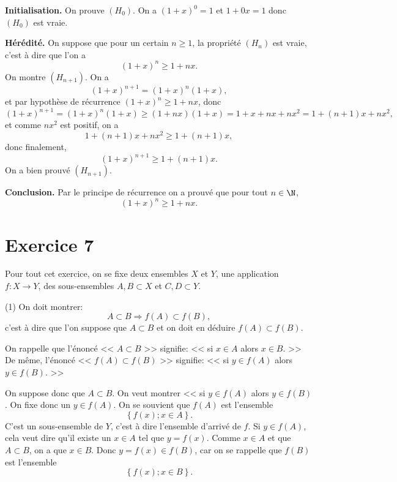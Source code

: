 \documentclass[12pt, a4paper,oneside]{article} %
\begin{document}
\textbf{Initialisation.}
On prouve $ (H_{0}) $.
On a $ (1+x)^{0} = 1 $
et $ 1 + 0x = 1 $
donc $ (H_{0}) $ est vraie.

\textbf{Hérédité.}
On suppose que pour un certain
$ n \ge 1 $,
la propriété
$ (H_{n}) $ est vraie,
c'est à dire que l'on a
\begin{equation}
	(1+x)^{n} 
	\ge
	1 + nx
	.
\end{equation}
On montre $ (H_{n+1}) $.
On a
\begin{equation}
	(1+x)^{n+1}
	=
	(1+x)^{n} 
	(1+x)
	,
\end{equation}
et par hypothèse de récurrence
$ (1+x)^n \ge 1 + nx $,
donc
\begin{equation}
	(1+x)^{n+1}
	=
	(1+x)^{n} 
	(1+x)
	\ge
	(1+nx)(1+x)
	=
	1 + x + nx + nx^2
	=
	1 + (n+1)x + nx^2
	,
\end{equation}
et comme $ nx^2 $
est positif, on a
\begin{equation}
	1 + (n+1)x + nx^2
	\ge
	1 + (n+1)x
	,
\end{equation}
donc finalement,
\begin{equation}
	(1+x)^{n+1}
	\ge
	1 + (n+1)x
	.
\end{equation}
On a bien prouvé $ (H_{n+1}) $.

\textbf{Conclusion.}
Par le principe de récurrence
on a prouvé que pour tout $ n \in \N $,
\begin{equation}
	(1+x)^{n}
	\ge
	1 + nx
	.
\end{equation}

\section{Exercice 7}

Pour tout cet exercice,
on se fixe
deux ensembles
$ X $ et $ Y $,
une application
$ f : X \to Y $,
des sous-ensembles
$ A,B \subset X $
et $ C,D \subset Y $.

(1) On doit montrer:
\begin{equation}
	A \subset B
	\Rightarrow
	f(A)
	\subset
	f(B)
	,
\end{equation}
c'est à dire que
l'on suppose que $ A \subset B $
et on doit en déduire
$ f(A) \subset f(B) $.

On rappelle que l'énoncé
<<
$ A \subset B $
>>
signifie:
<<
si $ x \in A $ alors $ x \in B $.
>>
De même, l'énoncé
<<
$ f(A) \subset f(B) $
>>
signifie:
<<
si $ y \in f(A) $
alors $ y \in f(B) $.
>>

On suppose donc que
$ A \subset B $.
On veut montrer
<<
si $ y \in f(A) $
alors $ y \in f(B) $.
On fixe donc un
$ y \in f(A) $.
On se souvient que
$ f(A) $ est l'ensemble
\begin{equation}
	\left\{ 
		f(x);
		x \in A
	\right\}
	.
\end{equation}
C'est un sous-ensemble
de $ Y $,
c'est à dire l'ensemble d'arrivé
de $ f $.
Si $ y \in f(A) $,
cela veut dire qu'il existe
un $ x \in A $ tel que
$ y = f(x) $.
Comme $ x \in A $
et que $ A \subset B $,
on a que $ x \in B $.
Donc $ y = f(x) \in f(B) $,
car on se rappelle que
$ f(B) $ est l'ensemble
\begin{equation}
	\left\{ 
		f(x);
		x \in B
	\right\}
	.
\end{equation}
\end{document}
